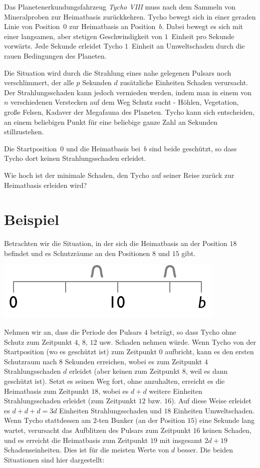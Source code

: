 

\noindent
Das Planetenerkundungsfahrzeug \emph{Tycho VIII} muss nach dem Sammeln von Mineralproben zur Heimatbasis zurückkehren.
Tycho bewegt sich in einer geraden Linie von Position~$0$ zur Heimatbasis an Position~$b$.
Dabei bewegt es sich mit einer langsamen, aber stetigen Geschwindigkeit von $1$~Einheit pro Sekunde vorwärts.
Jede Sekunde erleidet Tycho $1$~Einheit an Umweltschaden durch die rauen Bedingungen des Planeten.

Die Situation wird durch die Strahlung eines nahe gelegenen Pulsars noch verschlimmert, der alle $p$ Sekunden $d$ zusätzliche Einheiten Schaden verursacht.
Der Strahlungsschaden kann jedoch vermieden werden, indem man in einem von $n$ verschiedenen Verstecken auf dem Weg Schutz sucht - Höhlen, Vegetation, große Felsen, Kadaver der Megafauna des Planeten.
Tycho kann sich entscheiden, an einem beliebigen Punkt für eine beliebige ganze Zahl an Sekunden stillzustehen.

Die Startposition~$0$ und die Heimatbasis bei~$b$ sind beide geschützt, so dass Tycho dort keinen Strahlungsschaden erleidet.

\medskip
Wie hoch ist der minimale Schaden, den Tycho auf seiner Reise zurück zur Heimatbasis erleiden wird?

\section*{Beispiel}

Betrachten wir die Situation, in der sich die Heimatbasis an der Position $18$ befindet und es Schutzräume an den Positionen $8$ und $15$ gibt.

\includegraphics[width=.3\textwidth]{img/samplesetup}

Nehmen wir an, dass die Periode des Pulsars $4$ beträgt, so dass Tycho ohne Schutz zum Zeitpunkt $4$, $8$, $12$ usw. Schaden nehmen würde.
Wenn Tycho von der Startposition (wo es geschützt ist) zum Zeitpunkt $0$ aufbricht, kann es den ersten Schutzraum nach $8$ Sekunden erreichen, wobei es zum Zeitpunkt $4$ Strahlungsschaden $d$ erleidet (aber keinen zum Zeitpunkt $8$, weil es dann geschützt ist).
Setzt es seinen Weg fort, ohne anzuhalten, erreicht es die Heimatbasis zum Zeitpunkt $18$, wobei es $d+d$ weitere Einheiten Strahlungsschaden erleidet (zum Zeitpunkt $12$ bzw. $16$).
Auf diese Weise erleidet es $d+d+d=3d$ Einheiten Strahlungsschaden und $18$ Einheiten Umweltschaden.
Wenn Tycho stattdessen am $2$-ten Bunker (an der Position $15$) eine Sekunde lang wartet, verursacht das Aufblitzen des Pulsars zum Zeitpunkt $16$ keinen Schaden, und es erreicht die Heimatbasis zum Zeitpunkt $19$ mit insgesamt $2d + 19$ Schadenseinheiten.
Dies ist für die meisten Werte von $d$ besser.
Die beiden Situationen sind hier dargestellt:

